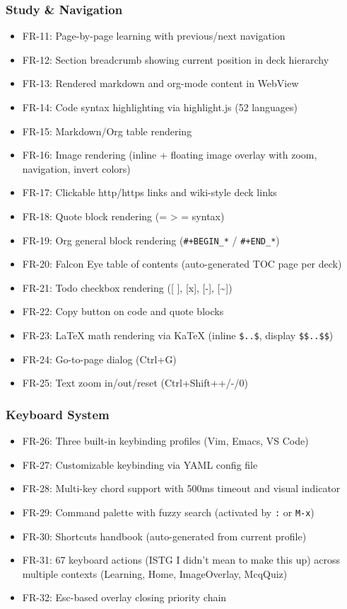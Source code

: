\documentclass[14pt]{article}
\begin{document}
\subsubsection{Study \& Navigation}
\label{sec:org82979a8}
\begin{itemize}
\item FR-11: Page-by-page learning with previous/next navigation
\item FR-12: Section breadcrumb showing current position in deck hierarchy
\item FR-13: Rendered markdown and org-mode content in WebView
\item FR-14: Code syntax highlighting via highlight.js (52 languages)
\item FR-15: Markdown/Org table rendering
\item FR-16: Image rendering (inline + floating image overlay with zoom,
navigation, invert colors)
\item FR-17: Clickable http/https links and wiki-style deck links
\item FR-18: Quote block rendering (= > = syntax)
\item FR-19: Org general block rendering (\texttt{\#+BEGIN\_*} / \texttt{\#+END\_*})
\item FR-20: Falcon Eye table of contents (auto-generated TOC page per deck)
\item FR-21: Todo checkbox rendering ([ ], [x], [-], [\textasciitilde{}])
\item FR-22: Copy button on code and quote blocks
\item FR-23: \LaTeX{} math rendering via KaTeX (inline \texttt{\$..\$}, display
\texttt{\$\$..\$\$})
\item FR-24: Go-to-page dialog (Ctrl+G)
\item FR-25: Text zoom in/out/reset (Ctrl+Shift++/-/0)
\end{itemize}

\newpage
\subsubsection{Keyboard System}
\label{sec:org05f78ea}
\begin{itemize}
\item FR-26: Three built-in keybinding profiles (Vim, Emacs, VS Code)
\item FR-27: Customizable keybinding via YAML config file
\item FR-28: Multi-key chord support with 500ms timeout and visual
indicator
\item FR-29: Command palette with fuzzy search (activated by \texttt{:} or \texttt{M-x})
\item FR-30: Shortcuts handbook (auto-generated from current profile)
\item FR-31: 67 keyboard actions (ISTG I didn't mean to make this up) across multiple contexts (Learning,
Home, ImageOverlay, McqQuiz)
\item FR-32: Esc-based overlay closing priority chain
\end{itemize}
\end{document}
